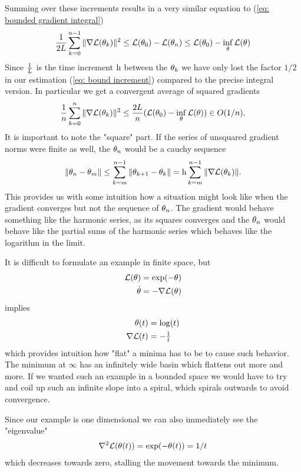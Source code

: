 Summing over these increments results in a very similar equation to
(\ref{eq: bounded gradient integral})
%
\begin{align*}
	\frac{1}{2L} \sum_{k=0}^{n-1}\|\nabla \mathcal{L}(\theta_k)\|^2
	\le \mathcal{L}(\theta_0) - \mathcal{L}(\theta_n)
	\le \mathcal{L}(\theta_0) - \inf_{\theta} \mathcal{L}(\theta)
\end{align*}
%
Since \(\tfrac{1}{L}\) is the time increment \(\text{h}\) between the \(\theta_k\)
we have only lost the factor \(1/2\) in our estimation (\ref{eq: bound increment})
compared to the precise integral version.
In particular we get a convergent average of squared gradients
%
\begin{align*}
	\frac{1}{n} \sum_{k=0}^n \|\nabla \mathcal{L}(\theta_k)\|^2
	\le \frac{2 L}{n} (\mathcal{L}(\theta_0) - \inf_\theta \mathcal{L}(\theta)) \in O(1/n).
\end{align*}
%
It is important to note the "square" part. If the series of unsquared gradient
norms were finite as well, the \(\theta_n\) would be a cauchy sequence
%
\begin{align*}
	\|\theta_n - \theta_m \|
	\le \sum_{k=m}^{n-1} \|\theta_{k+1} - \theta_k\|
	= \text{h} \sum_{k=m}^{n-1} \|\nabla \mathcal{L}(\theta_k)\|.
\end{align*}
%
This provides us with some intuition how a situation might look like when the
gradient converges but not the sequence of \(\theta_n\). The gradient would
behave something like the harmonic series, as its squares converges and the
\(\theta_n\) would behave like the partial sums of the harmonic series which
behaves like the logarithm in the limit.

It is difficult to formulate an example in finite space, but
%
\begin{align*}
	\mathcal{L}(\theta) &= \exp(-\theta) \\
	\dot{\theta} &= -\nabla \mathcal{L}(\theta)
\end{align*}
%
implies
%
\begin{align*}
	\theta(t) &= \log(t)\\
	\nabla \mathcal{L}(t) &= -\tfrac1t
\end{align*}
%
which provides intuition how "flat" a minima has to be to cause such behavior.
The minimum at \(\infty\) has an infinitely wide basin which flattens out
more and more. If we wanted such an example in a bounded space we would have
to try and coil up such an infinite slope into a spiral, which spirals outwards
to avoid convergence.

Since our example is one dimensional we can also immediately see the "eigenvalue"
%
\begin{align*}
	\nabla^2 \mathcal{L}(\theta(t)) = \exp(-\theta(t)) = 1/t
\end{align*}
%
which decreases towards zero, stalling the movement towards the minimum.

